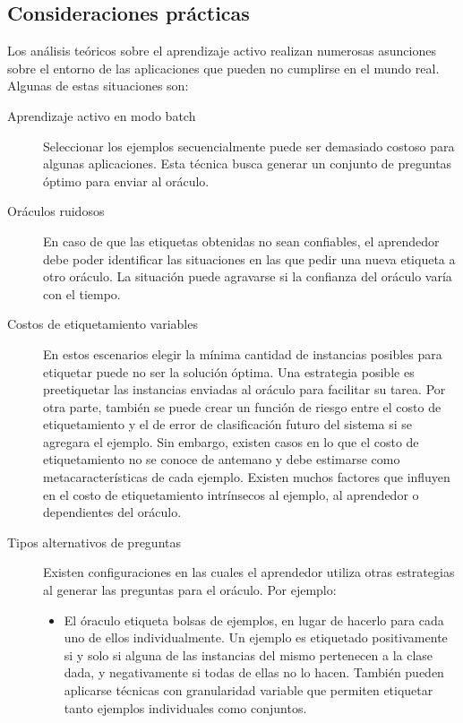 \documentclass[11pt,spanish]{article}
\begin{document}
\subsection{Consideraciones prácticas}
Los análisis teóricos sobre el aprendizaje activo realizan numerosas asunciones
sobre el entorno de las aplicaciones que pueden no cumplirse en el mundo real.
Algunas de estas situaciones son:
\begin{description}
    \item[Aprendizaje activo en modo batch] Seleccionar los ejemplos
    secuencialmente puede ser demasiado costoso para algunas aplicaciones. Esta
    técnica busca generar un conjunto de preguntas óptimo para enviar al
    oráculo.
    \item[Oráculos ruidosos] En caso de que las etiquetas obtenidas no sean
    confiables, el aprendedor debe poder identificar las situaciones en las que
    pedir una nueva etiqueta a otro oráculo. La situación puede agravarse si la
    confianza del oráculo varía con el tiempo.
    \item[Costos de etiquetamiento variables] En estos escenarios elegir la
    mínima cantidad de instancias posibles para etiquetar puede no ser la
    solución óptima. Una estrategia posible es preetiquetar las instancias
    enviadas al oráculo para facilitar su tarea. Por otra parte, también se
    puede crear un función de riesgo entre el costo de etiquetamiento y el de
    error de clasificación futuro del sistema si se agregara el ejemplo. Sin
    embargo, existen casos en lo que el costo de etiquetamiento no se conoce de
    antemano y debe estimarse como metacaracterísticas de cada ejemplo. Existen
    muchos factores que influyen en el costo de etiquetamiento intrínsecos al
    ejemplo, al aprendedor o dependientes del oráculo.
    \item[Tipos alternativos de preguntas] Existen configuraciones en las cuales
    el aprendedor utiliza otras estrategias al generar las preguntas para el
    oráculo. Por ejemplo:
    \begin{itemize}
        \item El óraculo etiqueta bolsas de ejemplos, en lugar de hacerlo para
        cada uno de ellos individualmente. Un ejemplo es etiquetado
        positivamente si y solo si alguna de las instancias del mismo pertenecen
        a la clase dada, y negativamente si todas de ellas no lo hacen. También
        pueden aplicarse técnicas con granularidad variable que permiten
        etiquetar tanto ejemplos individuales como conjuntos.

\end{itemize}
\end{description}
\end{document}
